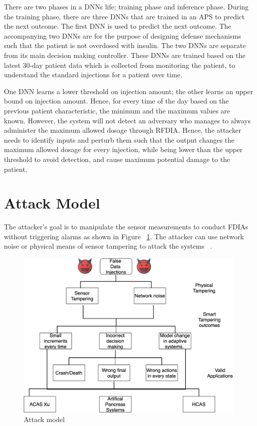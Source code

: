There are two phases in a \ac{DNN}s life; training phase and inference phase. 
During the training phase, there are three \ac{DNN}s that are trained in an \ac{APS} to predict the next outcome. 
The first \ac{DNN} is used to predict the next outcome. 
The accompanying two \ac{DNN}s are for the purpose of designing defense mechanisms such that the patient is not overdosed with insulin.  
The two \ac{DNN}s are separate from its main decision making controller. 
These \ac{DNN}s are trained based on the latest 30-day patient data which is collected from monitoring the patient, to understand the standard injections for a patient over time. 

One \ac{DNN} learns a lower threshold on injection amount; the other learns an upper bound on injection amount. 
Hence, for every time of the day based on the previous patient characteristic, the minimum and the maximum values are known. 
However, the system will not detect  an adversary  who manages to always administer the maximum allowed dosage through \ac{RFDIA}. 
Hence, the attacker needs to identify inputs and  perturb them  such that the output changes the maximum allowed dosage for every injection,
  while being lower than the upper threshold to avoid detection, and cause maximum potential damage to the patient. 


\section{Attack Model}
The attacker's goal is to manipulate the sensor measurements to conduct FDIAs without triggering alarms as shown in Figure ~\ref{fig:attackmodelphysical}. 
The attacker can use network noise or physical means of sensor tampering to attack the systems ~\cite{10.1145/3319535.3339815}.
 
\begin{figure}
	\centering
	\includegraphics[width=0.7\linewidth]{Images/Attackmodelphysical}
	\caption{Attack model}
	\label{fig:attackmodelphysical}
\end{figure}

